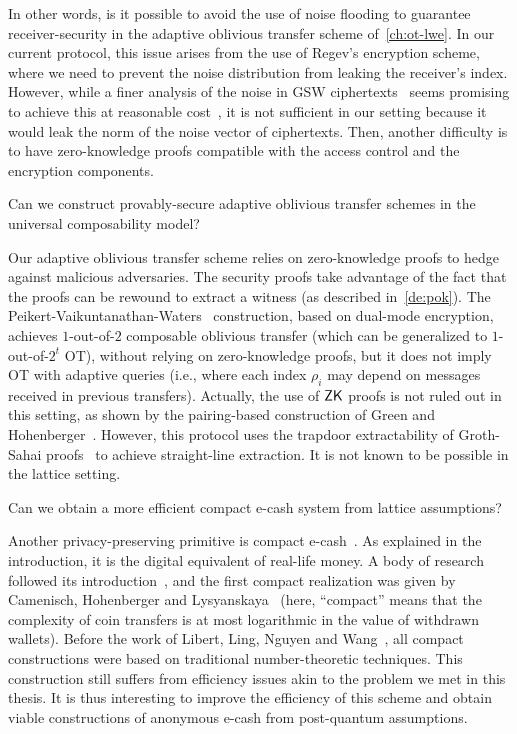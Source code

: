 In other words, is it possible to avoid the use of noise flooding to guarantee receiver-security in the adaptive oblivious transfer scheme of~\cref{ch:ot-lwe}.
In our current protocol, this issue arises from the use of Regev's encryption scheme, where we need to prevent the noise distribution from leaking the receiver's index.
However, while a finer analysis of the noise in GSW ciphertexts~\cite{GSW13} seems promising to achieve this at reasonable cost~\cite{BDPMW16}, it is not sufficient in our setting because it would leak the norm of the noise vector of ciphertexts.
Then, another difficulty is to have zero-knowledge proofs compatible with the access control and the encryption components.

\begin{question}
  Can we construct provably-secure adaptive oblivious transfer schemes in the universal composability model?
\end{question}

Our adaptive oblivious transfer scheme relies on zero-knowledge proofs to hedge against malicious adversaries.
The security proofs take advantage of the fact that the proofs can be rewound to extract a witness (as described in~\cref{de:pok}).
The Peikert-Vaikuntanathan-Waters~\cite{PVW08} construction, based on dual-mode encryption, achieves $1$-out-of-$2$ composable oblivious transfer (which can be generalized to $1$-out-of-$2^t$ OT), without relying on zero-knowledge proofs, but it does not imply OT with adaptive queries (i.e., where each index $\rho_i$ may depend on messages received in previous transfers).
Actually, the use of $\textsf{ZK}$ proofs is not ruled out in this setting, as shown by the pairing-based construction of Green and Hohenberger~\cite{GH08}.
However, this protocol uses the trapdoor extractability of Groth-Sahai proofs~\cite{GS08} to achieve straight-line extraction. It is not known to be possible in the lattice setting.

\begin{question}
  Can we obtain a more efficient compact e-cash system from lattice assumptions?
\end{question}

Another privacy-preserving primitive is compact e-cash~\cite{Cha82,Cha83,CHL05a}. As explained in the introduction, it is the digital equivalent of real-life money.
A body of research followed its introduction~\cite{CFN88,OO91,CP92,FY93,Oka95,Tsi97}, and the first compact realization was given by Camenisch, Hohenberger and Lysyanskaya~\cite{CHL05a} (here, ``compact'' means that the complexity of coin transfers is at most logarithmic in the value of withdrawn wallets).
Before the work of Libert, Ling, Nguyen and Wang~\cite{LLNW17}, all compact constructions were based on traditional number-theoretic techniques.
This construction still suffers from efficiency issues akin to the problem we met in this thesis.
It is thus interesting to improve the efficiency of this scheme and obtain viable constructions of anonymous e-cash from post-quantum assumptions.


